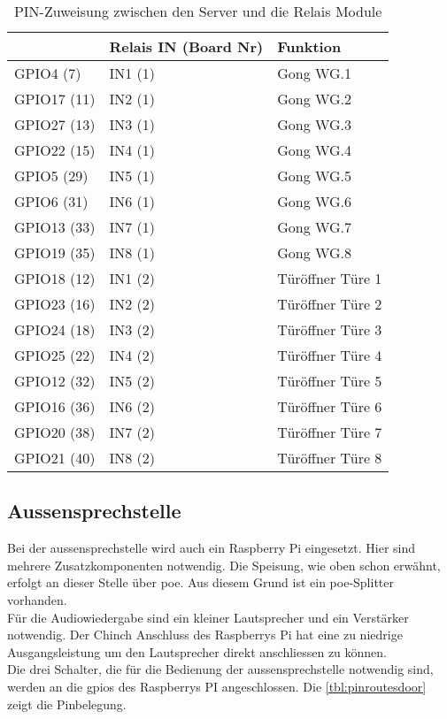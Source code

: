\begin{table}[]
	\centering
	\label{my-label}
	\begin{tabular}{l|ll}
		\multicolumn{1}{r|}{} \textbf{Pi GPIO (PIN)} & \textbf{Relais IN (Board Nr)} & \textbf{Funktion}  \hspace{60pt}	\\ \hline
		GPIO4 (7)	&	IN1 (1)			& Gong WG.1			\\ \hline
		GPIO17 (11)	&	IN2 (1)			& Gong WG.2			\\ \hline
		GPIO27 (13)	&	IN3 (1)			& Gong WG.3			\\ \hline
		GPIO22 (15)	&	IN4 (1)			& Gong WG.4			\\ \hline
		GPIO5 (29)	&	IN5 (1)			& Gong WG.5			\\ \hline
		GPIO6 (31)	&	IN6 (1)			& Gong WG.6			\\ \hline
		GPIO13 (33)	&	IN7 (1)			& Gong WG.7			\\ \hline
		GPIO19 (35)	&	IN8 (1)			& Gong WG.8			\\ \hline
		GPIO18 (12)	&	IN1 (2)			& Türöffner Türe 1			\\ \hline
		GPIO23 (16)	&	IN2 (2)			& Türöffner Türe 2			\\ \hline
		GPIO24 (18)	&	IN3 (2)			& Türöffner Türe 3			\\ \hline
		GPIO25 (22)	&	IN4 (2)			& Türöffner Türe 4			\\ \hline
		GPIO12 (32)	&	IN5 (2)			& Türöffner Türe 5			\\ \hline
		GPIO16 (36)	&	IN6 (2)			& Türöffner Türe 6			\\ \hline
		GPIO20 (38)	&	IN7 (2)			& Türöffner Türe 7			\\ \hline
		GPIO21 (40)	&	IN8 (2)			& Türöffner Türe 8			\\ \hline
	\end{tabular}
	\caption{PIN-Zuweisung zwischen den Server und die Relais Module}
	\label{tbl:pinroutes}
\end{table}


\subsection{Aussensprechstelle}
\label{sec:chapterexample}
Bei der \gls{aussensprechstelle} wird auch ein Raspberry Pi eingesetzt. Hier sind mehrere Zusatzkomponenten notwendig. Die Speisung, wie oben schon erwähnt, erfolgt an dieser Stelle über \gls{poe}. Aus diesem Grund ist ein \gls{poe}-Splitter vorhanden.
\\
Für die Audiowiedergabe sind ein kleiner Lautsprecher und ein Verstärker notwendig. Der Chinch Anschluss des Raspberrys Pi hat eine zu niedrige Ausgangsleistung um den Lautsprecher direkt anschliessen zu können.
\\
Die drei Schalter, die für die Bedienung der \gls{aussensprechstelle} notwendig sind, werden an die \gls{gpio}s des Raspberrys PI angeschlossen. Die \cref{tbl:pinroutesdoor} zeigt die Pinbelegung.

